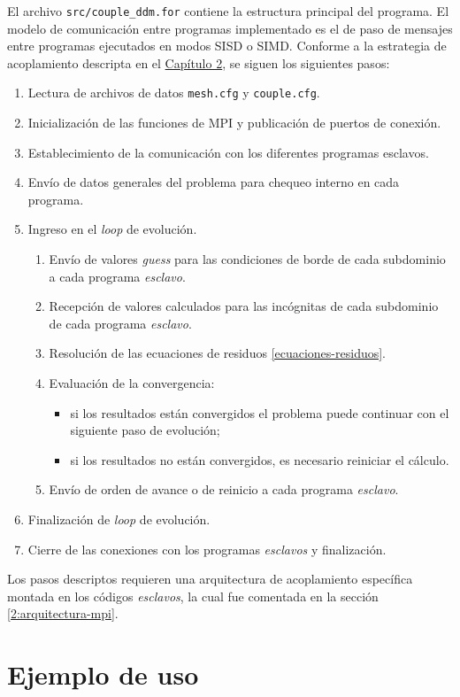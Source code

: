 El archivo \texttt{src/couple\_ddm.for} contiene la estructura principal del programa.
El modelo de comunicación entre programas implementado es el de paso de mensajes entre programas ejecutados en modos SISD o SIMD.
Conforme a la estrategia de acoplamiento descripta en el \hyperlink{chapter.2}{Capítulo 2}, se siguen los siguientes pasos:
\begin{enumerate}
\item Lectura de archivos de datos \texttt{mesh.cfg} y \texttt{couple.cfg}.
\item Inicialización de las funciones de MPI y publicación de puertos de conexión.
\item Establecimiento de la comunicación con los diferentes programas esclavos.
\item Envío de datos generales del problema para chequeo interno en cada programa.
\item Ingreso en el \textit{loop} de evolución.
\begin{enumerate}
\item Envío de valores \textit{guess} para las condiciones de borde de cada subdominio a cada programa \textit{esclavo}.
\item Recepción de valores calculados para las incógnitas de cada subdominio de cada programa \textit{esclavo}.
\item Resolución de las ecuaciones de residuos \ref{ecuaciones-residuos}.
\item Evaluación de la convergencia:
\begin{itemize}
\item si los resultados están convergidos el problema puede continuar con el siguiente paso de evolución;
\item si los resultados no están convergidos, es necesario reiniciar el cálculo.
\end{itemize}
\item Envío de orden de avance o de reinicio a cada programa \textit{esclavo}.
\end{enumerate}
\item Finalización de \textit{loop} de evolución.
\item Cierre de las conexiones con los programas \textit{esclavos} y finalización.
\end{enumerate}
Los pasos descriptos requieren una arquitectura de acoplamiento específica montada en los códigos \textit{esclavos}, la cual fue comentada en la sección \ref{2:arquitectura-mpi}.

\section{Ejemplo de uso}
\label{ap1:ejemplo}

